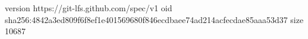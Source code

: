 version https://git-lfs.github.com/spec/v1
oid sha256:4842a3ed809f6f8ef1e401569680f846ecdbaee74ad214acfecdae85aaa53d37
size 10687

